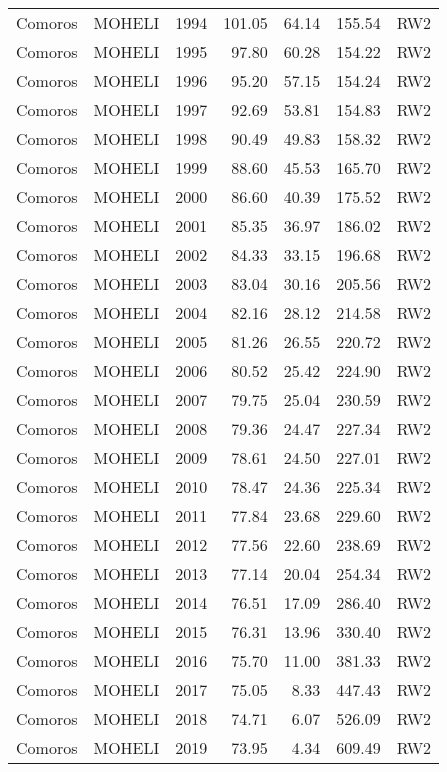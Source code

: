 \begin{longtable}{lllrrrl}
  Comoros & MOHELI & 1994 & 101.05 & 64.14 & 155.54 & RW2 \\ 
  Comoros & MOHELI & 1995 & 97.80 & 60.28 & 154.22 & RW2 \\ 
  Comoros & MOHELI & 1996 & 95.20 & 57.15 & 154.24 & RW2 \\ 
  Comoros & MOHELI & 1997 & 92.69 & 53.81 & 154.83 & RW2 \\ 
  Comoros & MOHELI & 1998 & 90.49 & 49.83 & 158.32 & RW2 \\ 
  Comoros & MOHELI & 1999 & 88.60 & 45.53 & 165.70 & RW2 \\ 
  Comoros & MOHELI & 2000 & 86.60 & 40.39 & 175.52 & RW2 \\ 
  Comoros & MOHELI & 2001 & 85.35 & 36.97 & 186.02 & RW2 \\ 
  Comoros & MOHELI & 2002 & 84.33 & 33.15 & 196.68 & RW2 \\ 
  Comoros & MOHELI & 2003 & 83.04 & 30.16 & 205.56 & RW2 \\ 
  Comoros & MOHELI & 2004 & 82.16 & 28.12 & 214.58 & RW2 \\ 
  Comoros & MOHELI & 2005 & 81.26 & 26.55 & 220.72 & RW2 \\ 
  Comoros & MOHELI & 2006 & 80.52 & 25.42 & 224.90 & RW2 \\ 
  Comoros & MOHELI & 2007 & 79.75 & 25.04 & 230.59 & RW2 \\ 
  Comoros & MOHELI & 2008 & 79.36 & 24.47 & 227.34 & RW2 \\ 
  Comoros & MOHELI & 2009 & 78.61 & 24.50 & 227.01 & RW2 \\ 
  Comoros & MOHELI & 2010 & 78.47 & 24.36 & 225.34 & RW2 \\ 
  Comoros & MOHELI & 2011 & 77.84 & 23.68 & 229.60 & RW2 \\ 
  Comoros & MOHELI & 2012 & 77.56 & 22.60 & 238.69 & RW2 \\ 
  Comoros & MOHELI & 2013 & 77.14 & 20.04 & 254.34 & RW2 \\ 
  Comoros & MOHELI & 2014 & 76.51 & 17.09 & 286.40 & RW2 \\ 
  Comoros & MOHELI & 2015 & 76.31 & 13.96 & 330.40 & RW2 \\ 
  Comoros & MOHELI & 2016 & 75.70 & 11.00 & 381.33 & RW2 \\ 
  Comoros & MOHELI & 2017 & 75.05 & 8.33 & 447.43 & RW2 \\ 
  Comoros & MOHELI & 2018 & 74.71 & 6.07 & 526.09 & RW2 \\ 
  Comoros & MOHELI & 2019 & 73.95 & 4.34 & 609.49 & RW2 \\ 

\end{longtable}
